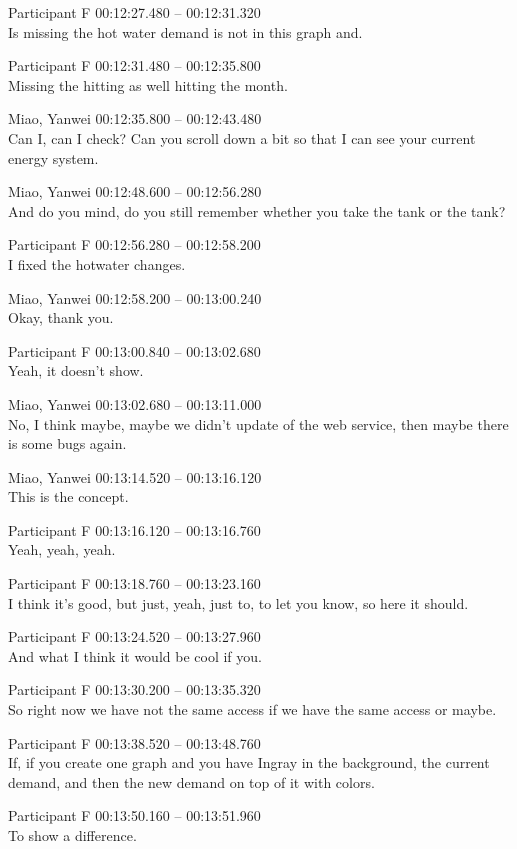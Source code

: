 {Participant F 00:12:27.480 -- 00:12:31.320 \\
Is missing the hot water demand is not in this graph and.

Participant F 00:12:31.480 -- 00:12:35.800 \\
Missing the hitting as well hitting the month.

Miao, Yanwei 00:12:35.800 -- 00:12:43.480 \\
Can I, can I check? Can you scroll down a bit so that I can see your current energy system.

Miao, Yanwei 00:12:48.600 -- 00:12:56.280 \\
And do you mind, do you still remember whether you take the tank or the tank?

Participant F 00:12:56.280 -- 00:12:58.200 \\
I fixed the hotwater changes.

Miao, Yanwei 00:12:58.200 -- 00:13:00.240 \\
Okay, thank you.

Participant F 00:13:00.840 -- 00:13:02.680 \\
Yeah, it doesn't show.

Miao, Yanwei 00:13:02.680 -- 00:13:11.000 \\
No, I think maybe, maybe we didn't update of the web service, then maybe there is some bugs again.

Miao, Yanwei 00:13:14.520 -- 00:13:16.120 \\
This is the concept.

Participant F 00:13:16.120 -- 00:13:16.760 \\
Yeah, yeah, yeah.

Participant F 00:13:18.760 -- 00:13:23.160 \\
I think it's good, but just, yeah, just to, to let you know, so here it should.

Participant F 00:13:24.520 -- 00:13:27.960 \\
And what I think it would be cool if you.

Participant F 00:13:30.200 -- 00:13:35.320 \\
So right now we have not the same access if we have the same access or maybe.

Participant F 00:13:38.520 -- 00:13:48.760 \\
If, if you create one graph and you have Ingray in the background, the current demand, and then the new demand on top of it with colors.

Participant F 00:13:50.160 -- 00:13:51.960 \\
To show a difference.

}

